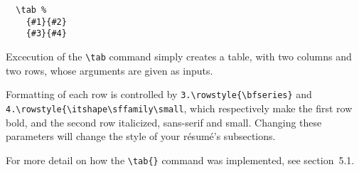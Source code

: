 \begin{lstlisting}
  \tab %
    {#1}{#2}
    {#3}{#4}
\end{lstlisting}

Excecution of the \lstinline|\tab| command simply creates a table, with two columns and two rows, whose arguments are given as inputs. \par

Formatting of each row is controlled by \lstinline|3.\rowstyle{\bfseries}| and \lstinline|4.\rowstyle{\itshape\sffamily\small|, which respectively make the first row bold, and the second row italicized, sans-serif and small. Changing these parameters will change the style of your r\'esum\'e's subsections. \par

For more detail on how the \lstinline|\tab{}| command was implemented, see section~5.1. \par